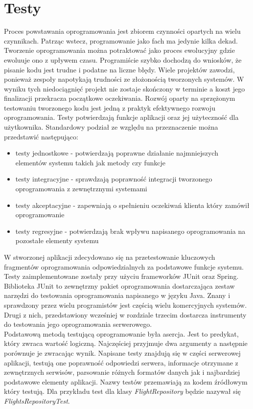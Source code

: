 \documentclass[12pt, twoside]{report}
\begin{document}
\chapter{Testy}
Proces powstawania oprogramowania jest zbiorem czynności opartych na wielu czynnikach. Patrząc wstecz, programowanie jako fach ma jedynie kilka dekad. Tworzenie oprogramowania można potraktować jako proces ewolucyjny gdzie ewoluuje ono z upływem czasu. Programiście szybko dochodzą do wniosków, że pisanie kodu jest trudne i podatne na liczne błędy. Wiele projektów zawodzi, ponieważ zespoły napotykają trudności ze złożonością tworzonych systemów. W wyniku tych niedociągnięć projekt nie zostaje skończony w terminie a koszt jego finalizacji przekracza początkowe oczekiwania\cite{testing}. Rozwój oparty na sprzężonym testowaniu tworzonego kodu jest jedną z praktyk efektywnego rozwoju oprogramowania. Testy potwierdzają funkcje aplikacji oraz jej użyteczność dla użytkownika. Standardowy podział ze względu na przeznaczenie można przedstawić następująco:
\begin{itemize}[noitemsep,topsep=0pt]
\item testy jednostkowe - potwierdzają poprawne działanie najmniejszych elementów systemu takich jak metody czy funkcje
\item testy integracyjne - sprawdzają poprawność integracji tworzonego oprogramowania z zewnętrznymi systemami
\item testy akceptacyjne - zapewniają o spełnieniu oczekiwań klienta który zamówił oprogramowanie
\item testy regresyjne - potwierdzają brak wpływu napisanego oprogramowania na pozostałe elementy systemu
\end{itemize}
W stworzonej aplikacji zdecydowano się na przetestowanie kluczowych fragmentów oprogramowania odpowiedzialnych za podstawowe funkcje systemu. Testy zaimplementowane zostały przy użyciu frameworków JUnit oraz Spring. Biblioteka JUnit to zewnętrzny pakiet oprogramowania dostarczająca zestaw narzędzi do testowania oprogramowania napisanego w języku Java. Znany i sprawdzony przez wielu programistów jest częścią wielu komercyjnych systemów. Drugi z nich, przedstawiony wcześniej w rozdziale trzecim dostarcza instrumenty do testowania jego oprogramowania serwerowego. \\ \indent
Podstawową metodą testującą oprogramowanie była asercja. Jest to predykat, który zwraca wartość logiczną. Najczęściej przyjmuje dwa argumenty a następnie porównuje je zwracając wynik\cite{assertion}. Napisane testy znajdują się w części serwerowej aplikacji, testują one poprawność odpowiedzi serwera, informacje otrzymane z zewnętrznych serwisów, parsowanie różnych formatów danych jak i najbardziej podstawowe elementy aplikacji. Nazwy testów przemawiają za kodem źródłowym który testują. Dla przykładu test dla klasy \textit{FlightRepository} będzie nazywał się \textit{FlightsRepositoryTest}. \\
\end{document}
